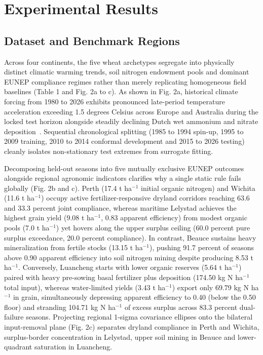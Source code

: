 \documentclass[11pt,a4paper]{article}
\begin{document}
\FloatBarrier

\section{Experimental Results}

\subsection{Dataset and Benchmark Regions}

Across four continents, the five wheat archetypes segregate into physically distinct climatic warming trends, soil nitrogen endowment pools and dominant EUNEP compliance regimes rather than merely replicating homogeneous field baselines (Table 1 and Fig. 2a to c). As shown in Fig. 2a, historical climate forcing from 1980 to 2026 exhibits pronounced late-period temperature acceleration exceeding 1.5 degrees Celsius across Europe and Australia during the locked test horizon alongside steadily declining Dutch wet ammonium and nitrate deposition~\citep{asseng2015,clo2022}. Sequential chronological splitting (1985 to 1994 spin-up, 1995 to 2009 training, 2010 to 2014 conformal development and 2015 to 2026 testing) cleanly isolates non-stationary test extremes from surrogate fitting.

Decomposing held-out seasons into five mutually exclusive EUNEP outcomes alongside regional agronomic indicators clarifies why a single static rule fails globally (Fig. 2b and c). Perth (17.4 t ha$^{-1}$ initial organic nitrogen) and Wichita (11.6 t ha$^{-1}$) occupy active fertilizer-responsive dryland corridors reaching 63.6 and 33.3 percent joint compliance, whereas maritime Lelystad achieves the highest grain yield (9.08 t ha$^{-1}$, 0.83 apparent efficiency) from modest organic pools (7.0 t ha$^{-1}$) yet hovers along the upper surplus ceiling (60.0 percent pure surplus exceedance, 20.0 percent compliance). In contrast, Beauce sustains heavy mineralization from fertile stocks (13.15 t ha$^{-1}$), pushing 91.7 percent of seasons above 0.90 apparent efficiency into soil nitrogen mining despite producing 8.53 t ha$^{-1}$. Conversely, Luancheng starts with lower organic reserves (5.64 t ha$^{-1}$) paired with heavy pre-sowing basal fertilizer plus deposition (174.50 kg N ha$^{-1}$ total input), whereas water-limited yields (3.43 t ha$^{-1}$) export only 69.79 kg N ha$^{-1}$ in grain, simultaneously depressing apparent efficiency to 0.40 (below the 0.50 floor) and stranding 104.71 kg N ha$^{-1}$ of excess surplus across 83.3 percent dual-failure seasons. Projecting regional 1-sigma covariance ellipses onto the bilateral input-removal plane (Fig. 2c) separates dryland compliance in Perth and Wichita, surplus-border concentration in Lelystad, upper soil mining in Beauce and lower-quadrant saturation in Luancheng.
\end{document}
